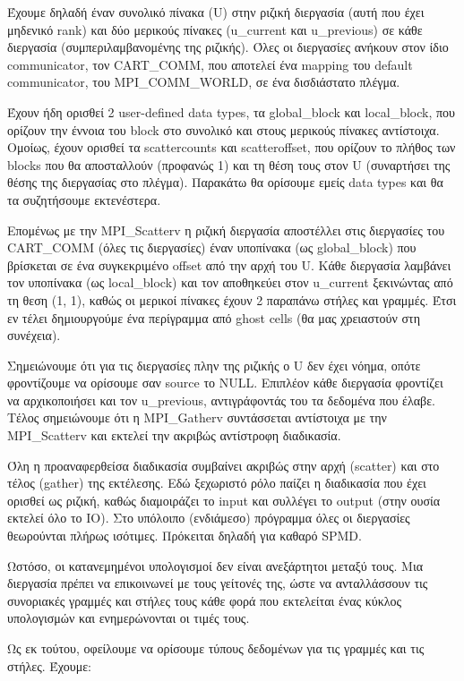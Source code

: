 \documentclass[12pt,titlepage]{article}
\begin{document}
Έχουμε δηλαδή έναν συνολικό πίνακα (U) στην ριζική διεργασία (αυτή που έχει
μηδενικό rank) και δύο μερικούς πίνακες (u\_current και u\_previous) σε κάθε
διεργασία (συμπεριλαμβανομένης της ριζικής). Όλες οι διεργασίες ανήκουν στον
ίδιο communicator, τον CART\_COMM, που αποτελεί ένα mapping του default
communicator, του MPI\_COMM\_WORLD, σε ένα δισδιάστατο πλέγμα.

Έχουν ήδη ορισθεί 2 user-defined data types, τα global\_block και local\_block,
που ορίζουν την έννοια του block στο συνολικό και στους μερικούς πίνακες
αντίστοιχα. Ομοίως, έχουν ορισθεί τα scattercounts και scatteroffset, που
ορίζουν το πλήθος των blocks που θα αποσταλλούν (προφανώς 1) και τη θέση τους
στον U (συναρτήσει της θέσης της διεργασίας στο πλέγμα). Παρακάτω θα ορίσουμε
εμείς data types και θα τα συζητήσουμε εκτενέστερα.

Επομένως με την MPI\_Scatterv η ριζική διεργασία αποστέλλει στις διεργασίες του
CART\_COMM (όλες τις διεργασίες) έναν υποπίνακα (ως global\_block) που βρίσκεται
σε ένα συγκεκριμένο offset από την αρχή του U. Κάθε διεργασία λαμβάνει τον
υποπίνακα (ως local\_block) και τον αποθηκεύει στον u\_current ξεκινώντας από τη
θεση (1, 1), καθώς οι μερικοί πίνακες έχουν 2 παραπάνω στήλες και γραμμές. Έτσι
εν τέλει δημιουργούμε ένα περίγραμμα από ghost cells (θα μας χρειαστούν στη
συνέχεια).

Σημειώνουμε ότι για τις διεργασίες πλην της ριζικής ο U δεν έχει νόημα, οπότε
φροντίζουμε να ορίσουμε σαν source το NULL. Επιπλέον κάθε διεργασία φροντίζει να
αρχικοποιήσει και τον u\_previous, αντιγράφοντάς του τα δεδομένα που έλαβε.
Τέλος σημειώνουμε ότι η MPI\_Gatherv συντάσσεται αντίστοιχα με την MPI\_Scatterv
και εκτελεί την ακριβώς αντίστροφη διαδικασία.

Όλη η προαναφερθείσα διαδικασία συμβαίνει ακριβώς στην αρχή (scatter) και στο
τέλος (gather) της εκτέλεσης. Εδώ ξεχωριστό ρόλο παίζει η διαδικασία που έχει
ορισθεί ως ριζική, καθώς διαμοιράζει το input και συλλέγει το output (στην ουσία
εκτελεί όλο το IO). Στο υπόλοιπο (ενδιάμεσο) πρόγραμμα όλες οι διεργασίες
θεωρούνται πλήρως ισότιμες. Πρόκειται δηλαδή για καθαρό SPMD.

Ωστόσο, οι κατανεμημένοι υπολογισμοί δεν είναι ανεξάρτητοι μεταξύ τους. Μια
διεργασία πρέπει να επικοινωνεί με τους γείτονές της, ώστε να ανταλλάσσουν τις
συνοριακές γραμμές και στήλες τους κάθε φορά που εκτελείται ένας κύκλος
υπολογισμών και ενημερώνονται οι τιμές τους.

Ως εκ τούτου, οφείλουμε να ορίσουμε τύπους δεδομένων για τις γραμμές και τις
στήλες. Έχουμε:
\end{document}
